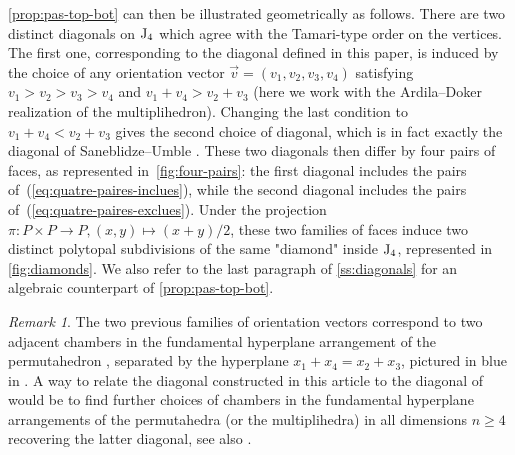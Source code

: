 \documentclass[twoside, 11pt]{amsart}
\theoremstyle{remark}
\newtheorem{remark}[definition]{\sc Remark}
\begin{document}
\cref{prop:pas-top-bot} can then be illustrated geometrically as follows. 
There are two distinct diagonals on $\mathrm{J}_4$ which agree with the Tamari-type order on the vertices. 
The first one, corresponding to the diagonal defined in this paper, is induced by the choice of any orientation vector $\vec v=(v_1,v_2,v_3,v_4)$ satisfying $v_1>v_2>v_3>v_4$ and $v_1 + v_4 > v_2+v_3$ (here we work with the Ardila--Doker realization of the multiplihedron).
Changing the last condition to $v_1 + v_4 < v_2+v_3$ gives the second choice of diagonal, which is in fact exactly the diagonal of Saneblidze--Umble \cite[Section 5]{SaneblidzeUmble04}. 
These two diagonals then differ by four pairs of faces, as represented in~\cref{fig:four-pairs}: the first diagonal includes the pairs of~(\ref{eq:quatre-paires-inclues}), while the second diagonal includes the pairs of~(\ref{eq:quatre-paires-exclues}).
Under the projection $\pi : P\times P \to P, (x,y) \mapsto (x+y)/2$, these two families of faces induce two distinct polytopal subdivisions of the same "diamond" inside $\mathrm{J}_4$, represented in \cref{fig:diamonds}. 
We also refer to the last paragraph of \cref{ss:diagonals} for an algebraic counterpart of \cref{prop:pas-top-bot}.

\begin{remark}
  The two previous families of orientation vectors correspond to two adjacent chambers in the fundamental hyperplane arrangement of the permutahedron \cite[Theorem 3.6]{LA21}, separated by the hyperplane $x_1+x_4=x_2+x_3$, pictured in blue in \cite[Figure 12]{LA21}.
  A way to relate the diagonal constructed in this article to the diagonal of \cite[Section 5]{SaneblidzeUmble04} would be to find further choices of chambers in the fundamental hyperplane arrangements of the permutahedra (or the multiplihedra) in all dimensions $n \geq 4$ recovering the latter diagonal, see also \cite[Remark~3.18]{LA21}.
\end{remark}
\end{document}
